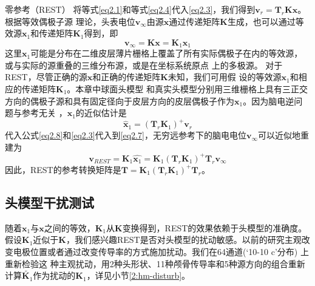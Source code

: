 零参考（REST）
将等式\eqref{eq2.1}和等式\eqref{eq2.4}代入\eqref{eq2.3}，我们得到$\mathbf{v}_r=\mathbf{T}_{r}\mathbf{Kx}$。根据等效偶极子源
理论，头表电位$\mathbf{v}_{\infty}$由源$\mathbf{x}$通过传递矩阵$\mathbf{K}$生成，也可以通过等效源$\mathbf{x}_1$和传递矩阵$\mathbf{K}_1$得到，即
\begin{equation}\label{eq2.7}
\mathbf{v}_{\infty}=\mathbf{Kx}=\mathbf{K}_1\mathbf{x}_1
\end{equation}
这里$\mathbf{x}_1$可能是分布在二维皮层薄片栅格上覆盖了所有实际偶极子在内的等效源，或与实际的源重叠的三维分布源，或是在坐标系统原点
上的多极源。 对于REST，尽管正确的源$\mathbf{x}$和正确的传递矩阵$\mathbf{K}$未知，我们可用假
设的等效源$\mathbf{x}_1$和相应的传递矩阵$\mathbf{K}_1$。本章中球面头模型
和真实头模型分别用三维栅格上具有三正交方向的偶极子源和具有固定径向于皮层方向的皮层偶极子作为$\mathbf{x}_1$。因为脑电逆问题与参考无关
，$\mathbf{x}_1$的近似估计是
\begin{equation}\label{eq2.8}
\hat{\mathbf{x}}_1=(\mathbf{T}_r\mathbf{K}_1)^+\mathbf{v}_r
\end{equation}
代入公式\eqref{eq2.8}和\eqref{eq2.3}代入到\eqref{eq2.7}，无穷远参考下的脑电电位$\mathbf{v}_{\infty}$可以近似地重建为
\begin{equation}\label{eq2.9}
\mathbf{v}_{REST}=\mathbf{K}_1\hat{\mathbf{x}_1}=\mathbf{K}_1(\mathbf{T}_r\mathbf{K}_1)^+\mathbf{T}_r\mathbf{v}_\infty
\end{equation}
因此，REST的参考转换矩阵是$\mathbf{T}=\mathbf{K}_1(\mathbf{T}_r\mathbf{K}_1)^+\mathbf{T}_r$。
\subsection{头模型干扰测试}
随着$\mathbf{x}_1$与$\mathbf{x}$之间的等效，$\mathbf{K}_1$从$\mathbf{K}$变换得到，REST的效果依赖于头模型的准确度。假设$\mathbf{K}_1$近似于$\mathbf{K}$，我们感兴趣REST是否对头模型的扰动敏感。以前的研究主观改变电极位置或者通过改变传导率的方式施加扰动。我们在64通道(‘10-10 c’分布) 上重新检验这
种主观扰动，用2种头形状、11种颅骨传导率和5种源方向的组合重新计算$\tilde{\mathbf{K}_1}$作为扰动的$\mathbf{K}_1$，详见小节\ref{2:hm-disturb}。

